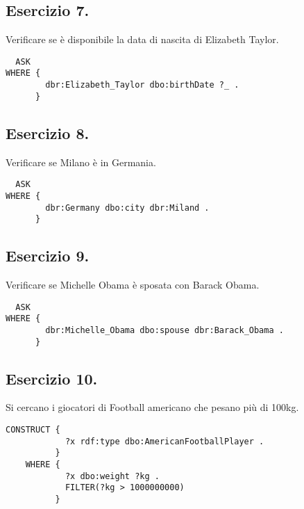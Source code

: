 \documentclass[11pt]{article}
\begin{document}
\subsection*{Esercizio 7.}
Verificare se è disponibile la data di nascita di Elizabeth Taylor.
\begin{verbatim}
  ASK
WHERE {
        dbr:Elizabeth_Taylor dbo:birthDate ?_ .
      }
\end{verbatim}

\subsection*{Esercizio 8.}
Verificare se Milano è in Germania.
\begin{verbatim}
  ASK
WHERE {
        dbr:Germany dbo:city dbr:Miland .
      }
\end{verbatim}

\subsection*{Esercizio 9.}
Verificare se Michelle Obama è sposata con Barack Obama.
\begin{verbatim}
  ASK
WHERE {
        dbr:Michelle_Obama dbo:spouse dbr:Barack_Obama .
      }
\end{verbatim}

\subsection*{Esercizio 10.}
Si cercano i giocatori di Football americano che pesano più di 100kg.
\begin{verbatim}
CONSTRUCT {
            ?x rdf:type dbo:AmericanFootballPlayer .
          }
    WHERE {
            ?x dbo:weight ?kg .
            FILTER(?kg > 1000000000)
          }
\end{verbatim}
\end{document}
